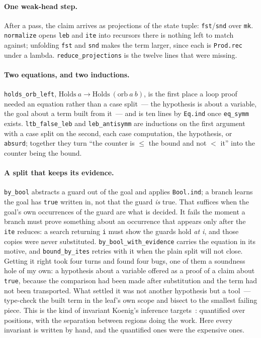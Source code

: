 \documentclass[11pt]{article}
\begin{document}
\paragraph{One weak-head step.}
After a pass, the claim arrives as projections of the state tuple:
\texttt{fst}/\texttt{snd} over \texttt{mk}.  \texttt{normalize} opens
\texttt{leb} and \texttt{ite} into recursors there is nothing left to match
against; unfolding \texttt{fst} and \texttt{snd} makes the term larger,
since each is \texttt{Prod.rec} under a lambda.  \texttt{reduce\_projections}
is the twelve lines that were missing.

\paragraph{Two equations, and two inductions.}
\texttt{holds\_orb\_left}, $\mathrm{Holds}\ a \to \mathrm{Holds}\ (\mathrm{orb}\ a\ b)$, is
the first place a loop proof needed an equation rather than a case
split~--- the hypothesis is about a variable, the goal about a term built
from it~--- and is ten lines by \texttt{Eq.ind} once \texttt{eq\_symm}
exists.  \texttt{ltb\_false\_leb} and \texttt{leb\_antisymm} are inductions
on the first argument with a case split on the second, each case
computation, the hypothesis, or \texttt{absurd}; together they turn ``the
counter is $\le$ the bound and not $<$ it'' into the counter being the
bound.

\paragraph{A split that keeps its evidence.}
\texttt{by\_bool} abstracts a guard out of the goal and applies
\texttt{Bool.ind}; a branch learns the goal has \texttt{true} written in,
not that the guard \emph{is} true.  That suffices when the goal's own
occurrences of the guard are what is decided.  It fails the moment a
branch must prove something about an occurrence that appears only after the
\texttt{ite} reduces: a search returning \texttt{i} must show the guards
hold \emph{at i}, and those copies were never substituted.
\texttt{by\_bool\_with\_evidence} carries the equation in its motive, and
\texttt{bound\_by\_ites} retries with it when the plain split will not
close.  Getting it right took four turns and found four bugs, one of them a
soundness hole of my own: a hypothesis about a variable offered as a proof
of a claim about \texttt{true}, because the comparison had been made after
substitution and the term had not been transported.  What settled it was
not another hypothesis but a tool~--- type-check the built term in the
leaf's own scope and bisect to the smallest failing piece.  This is the
kind of invariant Koenig's inference targets~\cite{koenig2022}: quantified
over positions, with the separation between regions doing the work.  Here
every invariant is written by hand, and the quantified ones were the
expensive ones.
\end{document}
